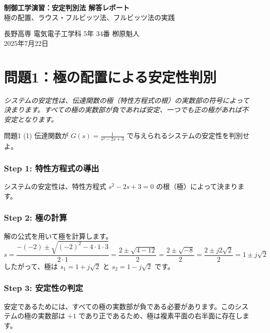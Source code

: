 \documentclass[11pt,a4paper]{ltjsarticle}
\begin{document}
\begin{center}
    {\Huge \bfseries 制御工学演習：安定判別法 解答レポート} \\
    \vspace{2mm}
    {\Large 極の配置、ラウス・フルビッツ法、フルビッツ法の実践}
\end{center}

\vspace{3mm}
\begin{flushright}
    長野高専 電気電子工学科 5年 34番 栁原魁人 \\
    2025年7月22日
\end{flushright}
\vspace{5mm}

\section{問題1：極の配置による安定性判別}
\textit{システムの安定性は、伝達関数の極（特性方程式の根）の実数部の符号によって決まります。すべての極の実数部が負であれば安定、一つでも正の極があれば不安定となります。}

\begin{problem}{問題1 (1)}
    伝達関数が $G(s) = \frac{1}{s^2-2s+3}$ で与えられるシステムの安定性を判別せよ。
\end{problem}

\begin{solution}
    \subsubsection*{Step 1: 特性方程式の導出}
    システムの安定性は、特性方程式 $s^2-2s+3=0$ の根（極）によって決まります。

    \subsubsection*{Step 2: 極の計算}
    解の公式を用いて極を計算します。
    $$ s = \frac{-(-2) \pm \sqrt{(-2)^2 - 4 \cdot 1 \cdot 3}}{2 \cdot 1} = \frac{2 \pm \sqrt{4-12}}{2} = \frac{2 \pm \sqrt{-8}}{2} = \frac{2 \pm j2\sqrt{2}}{2} = 1 \pm j\sqrt{2} $$
    したがって、極は $s_1 = 1 + j\sqrt{2}$ と $s_2 = 1 - j\sqrt{2}$ です。

    \subsubsection*{Step 3: 安定性の判定}
    安定であるためには、すべての極の実数部が負である必要があります。このシステムの極の実数部は $+1$ であり正であるため、極は複素平面の右半面に存在します。
\end{solution}
\end{document}
